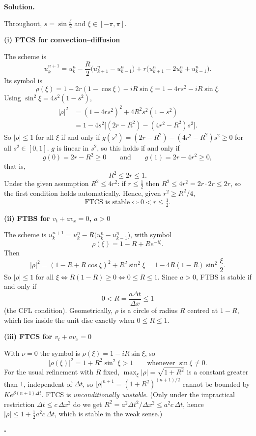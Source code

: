 \documentclass[11pt,a4paper]{article}
\newenvironment{solution}
  {\par\noindent\textbf{Solution.}\par\nobreak}
  {\par\hfill\(\square\)\par}
\newcommand{\step}[1]{\par\addvspace{0.5em}\noindent\textbf{#1}\par\nobreak}
\begin{document}
\begin{solution}
Throughout, \(s=\sin\frac\xi2\) and \(\xi\in[-\pi,\pi]\).

\step{(i) FTCS for convection--diffusion}
The scheme is
\[
  u_k^{n+1}=u_k^n-\frac R2\bigl(u_{k+1}^n-u_{k-1}^n\bigr)
  +r\bigl(u_{k+1}^n-2u_k^n+u_{k-1}^n\bigr).
\]
Its symbol is
\[
  \rho(\xi)=1-2r(1-\cos\xi)-iR\sin\xi=1-4rs^2-iR\sin\xi .
\]
Using \(\sin^2\xi=4s^2(1-s^2)\),
\begin{align*}
  |\rho|^2&=(1-4rs^2)^2+4R^2s^2(1-s^2)\\
  &=1-4s^2\bigl[(2r-R^2)-(4r^2-R^2)s^2\bigr].
\end{align*}
So \(|\rho|\le1\) for all \(\xi\) if and only if
\(g(s^2)=(2r-R^2)-(4r^2-R^2)s^2\ge0\) for all \(s^2\in[0,1]\).  \(g\) is
linear in \(s^2\), so this holds if and only if
\[
  g(0)=2r-R^2\ge0\qquad\text{and}\qquad g(1)=2r-4r^2\ge0,
\]
that is,
\[
  R^2\le2r\le1 .
\]
Under the given assumption \(R^2\le4r^2\): if \(r\le\frac12\) then
\(R^2\le4r^2=2r\cdot2r\le2r\), so the first condition holds
automatically.  Hence, given \(r^2\ge R^2/4\),
\[
  \text{FTCS is stable}\iff 0<r\le\tfrac12 .
\]

\step{(ii) FTBS for \(v_t+av_x=0\), \(a>0\)}
The scheme is \(u_k^{n+1}=u_k^n-R\bigl(u_k^n-u_{k-1}^n\bigr)\), with
symbol
\[
  \rho(\xi)=1-R+Re^{-i\xi}.
\]
Then
\[
  |\rho|^2=(1-R+R\cos\xi)^2+R^2\sin^2\xi=1-4R(1-R)\sin^2\frac\xi2 .
\]
So \(|\rho|\le1\) for all \(\xi\iff R(1-R)\ge0\iff0\le R\le1\).  Since
\(a>0\), FTBS is stable if and only if
\[
  0<R=\frac{a\Delta t}{\Delta x}\le1
\]
(the CFL condition).  Geometrically, \(\rho\) is a circle of radius \(R\)
centred at \(1-R\), which lies inside the unit disc exactly when
\(0\le R\le1\).

\step{(iii) FTCS for \(v_t+av_x=0\)}
With \(\nu=0\) the symbol is \(\rho(\xi)=1-iR\sin\xi\), so
\[
  |\rho(\xi)|^2=1+R^2\sin^2\xi>1\qquad\text{whenever }\sin\xi\ne0 .
\]
For the usual refinement with \(R\) fixed, \(\max_\xi|\rho|=\sqrt{1+R^2}\)
is a constant greater than \(1\), independent of \(\Delta t\), so
\(|\rho|^{n+1}=(1+R^2)^{(n+1)/2}\) cannot be bounded by
\(Ke^{\beta(n+1)\Delta t}\).  FTCS is \emph{unconditionally unstable}.
(Only under the impractical restriction \(\Delta t\le c\,\Delta x^2\) do
we get \(R^2=a^2\Delta t^2/\Delta x^2\le a^2c\,\Delta t\), hence
\(|\rho|\le1+\frac12a^2c\,\Delta t\), which is stable in the weak sense.)


\end{solution}
\end{document}
